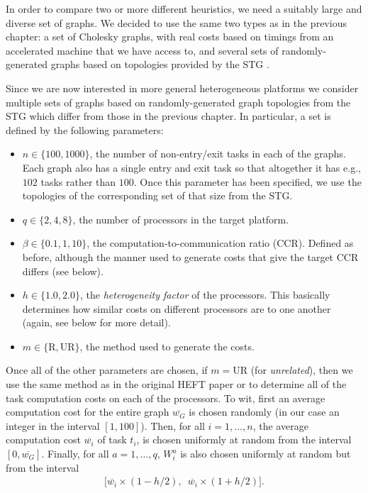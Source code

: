 \documentclass[12pt]{article}
\begin{document}
In order to compare two or more different heuristics, we need a suitably large and diverse set of graphs. We decided to use the same two types as in the previous chapter: a set of Cholesky graphs, with real costs based on timings from an accelerated machine that we have access to, and several sets of randomly-generated graphs based on topologies provided by the STG \cite{tob02}.

Since we are now interested in more general heterogeneous platforms we consider multiple sets of graphs based on randomly-generated graph topologies from the STG which differ from those in the previous chapter. In particular, a set is defined by the following parameters:
\begin{itemize}
	\item $n \in \{ 100, 1000 \}$, the number of non-entry/exit tasks in each of the graphs. Each graph also has a single entry and exit task so that altogether it has e.g., $102$ tasks rather than $100$. Once this parameter has been specified, we use the topologies of the corresponding set of that size from the STG. 
	\item $q \in \{2, 4, 8\}$, the number of processors in the target platform. 
	\item $\beta \in \{0.1, 1, 10\}$, the computation-to-communication ratio (CCR). Defined as before, although the manner used to generate costs that give the target CCR differs (see below).
	\item $h \in \{1.0, 2.0\}$, the {\em heterogeneity factor} of the processors. This basically determines how similar costs on different processors are to one another (again, see below for more detail).  
	\item $m \in \{\text{R}, \text{UR} \}$, the method used to generate the costs.
\end{itemize}
Once all of the other parameters are chosen, if $m = \text{UR}$ (for {\em unrelated}), then we use the same method as in the original HEFT paper \cite{topcuoglu2002performance} or \cite{arabnejad14} to determine all of the task computation costs on each of the processors. To wit, first an average computation cost for the entire graph $\overline{w_G}$ is chosen randomly (in our case an integer in the interval $[1, 100]$). Then, for all $i = 1, \dots, n$, the average computation cost $\overline{w_i}$ of task $t_i$, is chosen uniformly at random from the interval $[0, \overline{w_G}]$. Finally, for all $a = 1, \dots, q$, $W_i^a$ is also chosen uniformly at random but from the interval  
\begin{align*}
\big[ \overline{w_i} \times (1 - h/2), \enspace \overline{w_i} \times (1 + h/2)     \big].
\end{align*}
\end{document}

